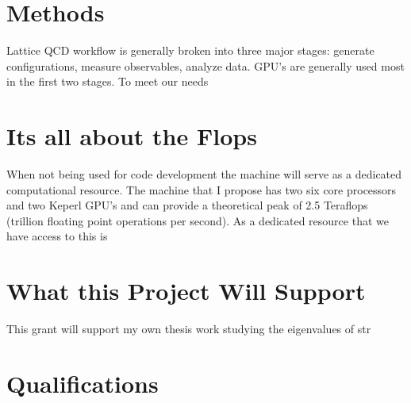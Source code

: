 \documentclass[11pt]{article}
\begin{document}
 

  \section*{Methods} %
  Lattice QCD workflow is generally broken into three major stages:  generate configurations, measure observables, analyze data.
  GPU's are generally used most in the first two stages.  
  To meet our needs

  
  \section*{Its all about the Flops} %
  When not being used for code development the machine will serve as a dedicated computational resource.  
  The machine that I propose has two six core processors and two Keperl GPU's and can provide a theoretical peak of 2.5 Teraflops (trillion floating point operations per second).  
  As a dedicated resource that we have access to this is

  \section*{What this Project Will Support} %
  This grant will support my own thesis work studying the eigenvalues of str

  \section*{Qualifications} %
\end{document}
